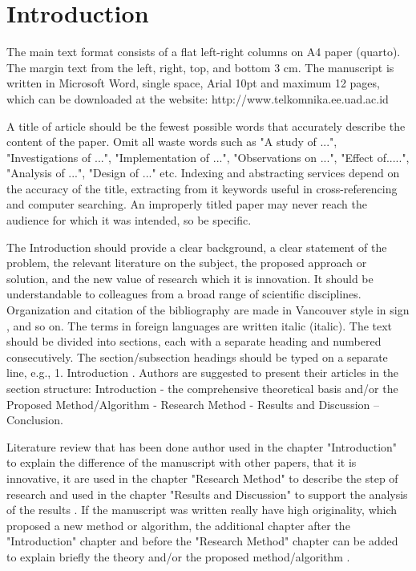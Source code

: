 \documentclass{iaesarticle3}
\begin{document}
\section{Introduction}
\label{}
The main text format consists of a flat left-right columns on A4 paper (quarto). The margin text from the left, right, top, and bottom 3 cm. The manuscript is written in Microsoft Word, single space, Arial 10pt and maximum 12 pages, which can be downloaded at the website: http://www.telkomnika.ee.uad.ac.id
\par
A title of article should be the fewest possible words that accurately describe the content of the paper. Omit all waste words such as "A study of ...", "Investigations of ...", "Implementation of ...", "Observations on ...", "Effect of.....", "Analysis of ...", "Design of ..." etc. Indexing and abstracting services depend on the accuracy of the title, extracting from it keywords useful in cross-referencing and computer searching. An improperly titled paper may never reach the audience for which it was intended, so be specific.
\par
The Introduction should provide a clear background, a clear statement of the problem, the relevant literature on the subject, the proposed approach or solution, and the new value of research which it is innovation. It should be understandable to colleagues from a broad range of scientific disciplines. Organization and citation of the bibliography are made in Vancouver style in sign \cite{Li}, \cite{Arulmozhiyal} and so on. The terms in foreign languages are written italic (italic). The text should be divided into sections, each with a separate heading and numbered consecutively. The section/subsection headings should be typed on a separate line, e.g., 1. Introduction \cite{Zhang}. Authors are suggested to present their articles in the section structure: Introduction - the comprehensive theoretical basis and/or the Proposed Method/Algorithm - Research Method - Results and Discussion – Conclusion.
\par
Literature review that has been done author used in the chapter "Introduction" to explain the difference of the manuscript with other papers, that it is innovative, it are used in the chapter "Research Method" to describe the step of research and used in the chapter "Results and Discussion" to support the analysis of the results \cite{Arulmozhiyal}. If the manuscript was written really have high originality, which proposed a new method or algorithm, the additional chapter after the "Introduction" chapter and before the "Research Method" chapter can be added to explain briefly the theory and/or the proposed method/algorithm \cite{Zhang}.
\end{document}
